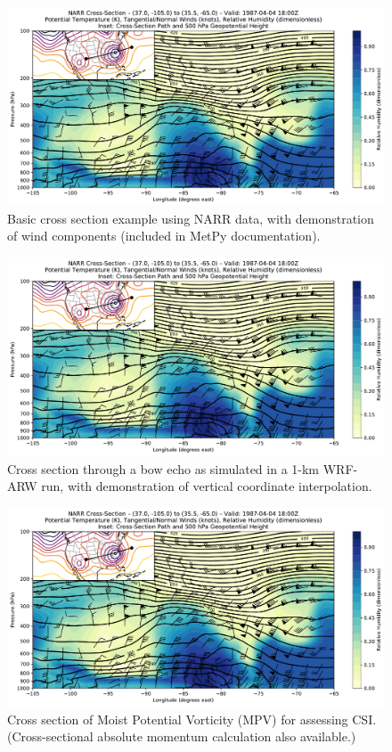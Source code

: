 \documentclass[final]{beamer}
\newlength{\colwidth}
\begin{document}
\begin{frame}[t, fragile]
\begin{columns}[t]
\begin{column}{\colwidth}
\begin{exampleblock}
    \begin{figure}
      \centering
      \includegraphics[width=\colwidth]{figures/basic_example_narr.pdf}
      \caption{Basic cross section example using NARR data, with demonstration of wind components (included in MetPy documentation).}
    \end{figure}
    \begin{figure}
      \centering
      \includegraphics[width=\colwidth]{figures/basic_example_narr.pdf}
      \caption{Cross section through a bow echo as simulated in a 1-km WRF-ARW run, with demonstration of vertical coordinate interpolation.}
    \end{figure}
    \begin{figure}
      \centering
      \includegraphics[width=\colwidth]{figures/basic_example_narr.pdf}
      \caption{Cross section of Moist Potential Vorticity (MPV) for assessing CSI. (Cross-sectional absolute momentum calculation also available.)}
    \end{figure}


\end{exampleblock}
\end{column}
\end{columns}
\end{frame}
\end{document}
